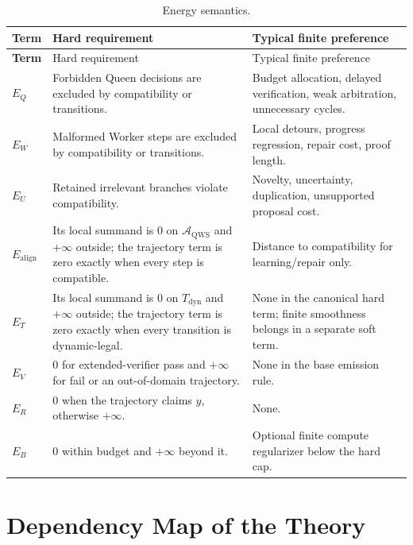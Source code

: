 \documentclass[11pt,oneside]{book}
\theoremstyle{remark}
\newcommand{\AQWS}{\mathcal A_{\mathrm{QWS}}}
\begin{document}
\begin{longtable}{>{\bfseries\RaggedRight\arraybackslash}p{}
>{\RaggedRight\arraybackslash}p{}
>{\RaggedRight\arraybackslash}p{}}
\caption{Energy semantics.}\\
\toprule
Term & Hard requirement & Typical finite preference \\
\midrule
\endfirsthead
\toprule
Term & Hard requirement & Typical finite preference \\
\midrule
\endhead
$E_Q$ & Forbidden Queen decisions are excluded by compatibility or transitions. & Budget allocation, delayed verification, weak arbitration, unnecessary cycles. \\
$E_W$ & Malformed Worker steps are excluded by compatibility or transitions. & Local detours, progress regression, repair cost, proof length. \\
$E_U$ & Retained irrelevant branches violate compatibility. & Novelty, uncertainty, duplication, unsupported proposal cost. \\
$E_{\mathrm{align}}$ & Its local summand is $0$ on $\AQWS$ and $+\infty$ outside; the trajectory term is zero exactly when every step is compatible. & Distance to compatibility for learning/repair only. \\
$E_T$ & Its local summand is $0$ on $T_{\mathrm{dyn}}$ and $+\infty$ outside; the trajectory term is zero exactly when every transition is dynamic-legal. & None in the canonical hard term; finite smoothness belongs in a separate soft term. \\
$E_V$ & $0$ for extended-verifier pass and $+\infty$ for fail or an out-of-domain trajectory. & None in the base emission rule. \\
$E_R$ & $0$ when the trajectory claims $y$, otherwise $+\infty$. & None. \\
$E_B$ & $0$ within budget and $+\infty$ beyond it. & Optional finite compute regularizer below the hard cap. \\
\bottomrule
\end{longtable}

\chapter{Dependency Map of the Theory}
\end{document}

